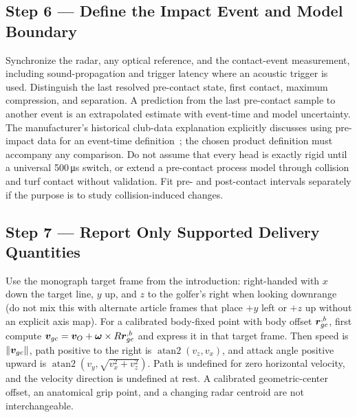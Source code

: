 \subsection*{Step 6 --- Define the Impact Event and Model Boundary}

Synchronize the radar, any optical reference, and the contact-event measurement, including sound-propagation and trigger latency where an acoustic trigger is used.
Distinguish the last resolved pre-contact state, first contact, maximum compression, and separation.
A prediction from the last pre-contact sample to another event is an extrapolated estimate with event-time and model uncertainty.
The manufacturer's historical club-data explanation explicitly discusses using pre-impact data for an event-time definition~\cite{trackmanclubdata}; the chosen product definition must accompany any comparison.
Do not assume that every head is exactly rigid until a universal 500\,\si{\micro\second} switch, or extend a pre-contact process model through collision and turf contact without validation.
Fit pre- and post-contact intervals separately if the purpose is to study collision-induced changes.

\subsection*{Step 7 --- Report Only Supported Delivery Quantities}

Use the monograph target frame from the introduction: right-handed with $x$ down the target
line, $y$ up, and $z$ to the golfer's right when looking downrange (do not mix this with
alternate article frames that place $+y$ left or $+z$ up without an explicit axis map).
For a calibrated body-fixed point with body offset $\bm{r}_{gc}^{,b}$, first compute
$\bm{v}_{gc}=\bm{v}_O+\bm{\omega}\times R\bm{r}_{gc}^{,b}$ and express it in that target frame.
Then speed is $\lVert\bm{v}_{gc}\rVert$, path positive to the right is
$\operatorname{atan2}(v_z,v_x)$, and attack angle positive upward is
$\operatorname{atan2}(v_y,\sqrt{v_x^2+v_z^2})$.
Path is undefined for zero horizontal velocity, and the velocity direction is undefined at rest.
A calibrated geometric-center offset, an anatomical grip point, and a changing radar centroid are not interchangeable.

